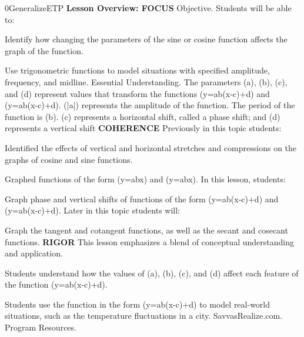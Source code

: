\documentclass{article}
\newenvironment{te-addendum}[2]{}{}     %
\begin{document}
\begin{te-addendum}{0}{GeneralizeETP}
\textbf{Lesson Overview: FOCUS}
Objective. Students will be able to:
\item Identify how changing the parameters of the sine or cosine function affects the graph of the function.
\item Use trigonometric functions to model situations with specified amplitude, frequency, and midline.
Essential Understanding. The parameters (a), (b), (c), and (d) represent values that transform the functions (y=a\sin b(x-c)+d) and (y=a\cos b(x-c)+d). (|a|) represents the amplitude of the function. The period of the function is (\frac{2\pi}b). (c) represents a horizontal shift, called a phase shift; and (d) represents a vertical shift
\textbf{COHERENCE}
Previously in this topic students:
\item Identified the effects of vertical and horizontal stretches and compressions on the graphs of cosine and sine functions.
\item Graphed functions of the form (y=a\sin bx) and (y=a\cos bx).
In this lesson, students:
\item Graph phase and vertical shifts of functions of the form (y=a\sin b(x-c)+d) and (y=a\cos b(x-c)+d).
Later in this topic students will:
\item Graph the tangent and cotangent functions, as well as the secant and cosecant functions.
\textbf{RIGOR}
This lesson emphasizes a blend of conceptual understanding and application.
\item Students understand how the values of (a), (b), (c), and (d) affect each feature of the function (y=a\sin b(x-c)+d).
\item Students use the function in the form (y=a\sin b(x-c)+d) to model real-world situations, such as the temperature fluctuations in a city.
SavvasRealize.com. Program Resources.
\end{te-addendum}
\end{document}
